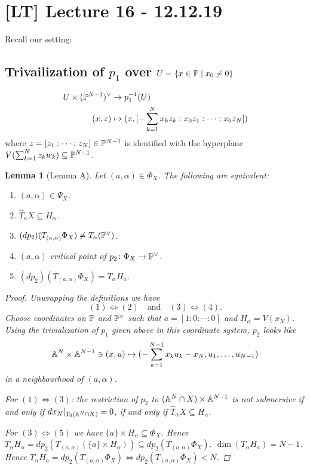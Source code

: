 \documentclass[A4paper, british]{amsart}
\theoremstyle{darkgreentheorem}
\newtheorem{lm}[thm]{Lemma}
\theoremstyle{darkbluedefinition}
\theoremstyle{darkredexample}
\theoremstyle{remark}
\newcommand{\1}{\mathbbm{1}}
\newcommand{\dual}{^{\vee}}
\newcommand{\sub}{\subseteq}
\begin{document}
\section{[LT] Lecture 16 - 12.12.19}

Recall our setting:
\begin{center}
\end{center}

\subsection{Trivailization of $p_{1}$ over $U=\{x\in \P\mid x_{0}\neq 0\}$}

\begin{align*}
    U\times (\P^{N-1})\dual & \to p_{1}^{-1}(U) \\
    (x,z) & \mapsto (x, [-\sum_{k=1}^{N} x_{k}z_{k}:x_{0}z_{1}:\cdots :x_{0}z_{N}])
\end{align*}
where $z=[z_{1}:\cdots :z_{N}]\in \P^{N-1}$ is identified with the hyperplane $V(\sum_{k=1}^{N}z_{k}w_{k})\sub \P^{N-1}$.

\begin{lm}[Lemma A]
    Let $(a,\alpha)\in \Phi_{X}$.
    The following are equivalent:
    \begin{enumerate}
	\item $(a,\alpha)\in \Psi_{X}$.
	\item $\hat{T}_{a}X\sub H_{\alpha}$.
	\item $(dp_{2})(T_{(a,\alpha)}\Phi_{X})\neq T_{\alpha}(\P\dual)$.
	\item $(a,\alpha)$ critical point of $p_{2}\colon \Phi_{X}\to \P\dual$.
	\item $(dp_{2})(T_{(a,\alpha)}\Phi_{X})=T_{\alpha}H_{a}$.
    \end{enumerate}
    \begin{proof}
	Unwrapping the definitions we have
	\[ (1)\Leftrightarrow (2) \quad \text{and} \quad (3)\Leftrightarrow (4). \]
	Choose coordinates on $\P$ and $\P\dual$ such that $a=[1:0:\cdots:0]$ and $H_{\alpha}=V(x_{N})$.
	Using the trivialization of $p_{1}$ given above in this coordinate system, $p_{2}$ looks like
	\[ \A^{N}\times \A^{N-1}\ni (x,u)\mapsto (-\sum_{k=1}^{N-1}x_{k}u_{k}-x_{N},u_{1},\ldots,u_{N-1}) \]
	in a neighbourhood of $(a,\alpha)$.
	
	For $(1)\Leftrightarrow (3)$: the restriction of $p_{2}$ to $(\A^{N}\cap X)\times \A^{N-1}$ is not submersive if and only if $dx_{N}|_{T_{0}(\A^{N}\cap X)}=0$, if and only if $\hat{T}_{\alpha}X\sub H_{\alpha}$.

	For $(3)\Leftrightarrow (5)$ we have $\{a\}\times H_{\alpha}\sub \Phi_{X}$.
	Hence $T_{\alpha}H_{\alpha}=dp_{2}(T_{(a,\alpha)}(\{a\}\times H_{\alpha}))\sub dp_{2}(T_{(a,\alpha)}\Phi_{X})$.
	$\dim(T_{\alpha}H_{a})=N-1$.
	Hence $T_{\alpha}H_{a}=dp_{2}(T_{(a,\alpha)}\Phi_{X}) \Leftrightarrow dp_{2}(T_{(a,\alpha)}\Phi_{X}) < N$.
    \end{proof}
\end{lm}
\end{document}
